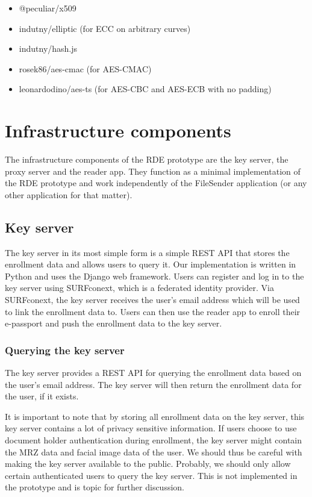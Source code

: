 \begin{itemize}
    \item \textsf{@peculiar/x509}
    \item \textsf{indutny/elliptic} (for ECC on arbitrary curves)
    \item \textsf{indutny/hash.js}
    \item \textsf{rosek86/aes-cmac} (for AES-CMAC)
    \item \textsf{leonardodino/aes-ts} (for AES-CBC and AES-ECB with no padding)
\end{itemize}

\section{Infrastructure components}\label{sec:infrastructure-components}
The infrastructure components of the RDE prototype are the key server, the proxy server and the reader app.
They function as a minimal implementation of the RDE prototype and work independently of the FileSender application (or any other application for that matter).

\subsection{Key server}\label{subsec:key-server}
The key server in its most simple form is a simple REST API that stores the enrollment data and allows users to query it.
Our implementation is written in Python and uses the Django web framework.
Users can register and log in to the key server using SURFconext, which is a federated identity provider.
Via SURFconext, the key server receives the user's email address which will be used to link the enrollment data to.
Users can then use the reader app to enroll their e-passport and push the enrollment data to the key server.

\subsubsection{Querying the key server}\label{subsubsec:querying-the-key-server}
The key server provides a REST API for querying the enrollment data based on the user's email address.
The key server will then return the enrollment data for the user, if it exists.

It is important to note that by storing all enrollment data on the key server, this key server contains a lot of privacy sensitive information.
If users choose to use document holder authentication during enrollment, the key server might contain the MRZ data and facial image data of the user.
We should thus be careful with making the key server available to the public.
Probably, we should only allow certain authenticated users to query the key server.
This is not implemented in the prototype and is topic for further discussion.

